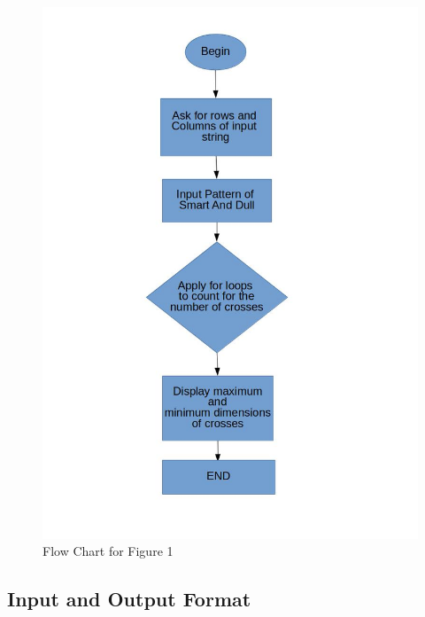 \documentclass[12pt]{article}
\begin{document}
			\begin{figure}[h!]
				\centering
				\caption{Flow Chart for Figure 1}
				\includegraphics[scale=.5]{ps1_f_1.jpg}
			\end{figure}

		\subsection{Input and Output Format}
		
\end{document}
